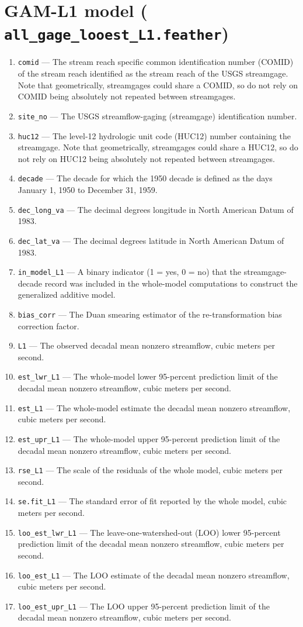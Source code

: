 \documentclass[1p, authoryear, 11pt, times, preprint]{elsarticle}
\newcommand{\code}[1]{{\color{black}%
                       \mbox{\lstinline[basicstyle={\small\ttfamily},
                                        keywordstyle=\scriptsize\ttfamily]|#1|}}}
\begin{document}
\section{GAM-L1 model (\code{all_gage_looest_L1.feather})}
\begin{enumerate}
\footnotesize
\RaggedRight
\item \code{comid} --- The stream reach specific common identification number (COMID) of the stream reach identified as the stream reach of the USGS streamgage. Note that geometrically, streamgages could share a COMID, so do not rely on COMID being absolutely not repeated between streamgages.
\item \code{site_no} --- The USGS streamflow-gaging (streamgage) identification number.
\item \code{huc12} --- The level-12 hydrologic unit code (HUC12) number containing the streamgage. Note that geometrically, streamgages could share a HUC12, so do not rely on HUC12 being absolutely not repeated between streamgages.
\item \code{decade} --- The decade for which the 1950 decade is defined as the days January 1, 1950 to December 31, 1959.
\item \code{dec_long_va} --- The decimal degrees longitude in North American Datum of 1983.
\item \code{dec_lat_va} --- The decimal degrees latitude in North American Datum of 1983.
\item \code{in_model_L1} --- A binary indicator (1 = yes, 0 = no) that the streamgage-decade record was included in the whole-model computations to construct the generalized additive model.
\item \code{bias_corr} --- The Duan smearing estimator of the re-transformation bias correction factor.
\item \code{L1} --- The observed decadal mean nonzero streamflow, cubic meters per second.
\item \code{est_lwr_L1} --- The whole-model lower 95-percent prediction limit of the decadal mean nonzero streamflow, cubic meters per second.
\item \code{est_L1} --- The whole-model estimate the decadal mean nonzero streamflow, cubic meters per second.
\item \code{est_upr_L1} --- The whole-model upper 95-percent prediction limit of the decadal mean nonzero streamflow, cubic meters per second.
\item \code{rse_L1} --- The scale of the residuals of the whole model, cubic meters per second.
\item \code{se.fit_L1} --- The standard error of fit reported by the whole model, cubic meters per second.
\item \code{loo_est_lwr_L1} --- The leave-one-watershed-out (LOO) lower 95-percent prediction limit of the decadal mean nonzero streamflow, cubic meters per second.
\item \code{loo_est_L1} --- The LOO estimate of the decadal mean nonzero streamflow, cubic meters per second.
\item \code{loo_est_upr_L1} --- The LOO upper 95-percent prediction limit of the decadal  mean nonzero streamflow, cubic meters per second.
\end{enumerate}
\end{document}
